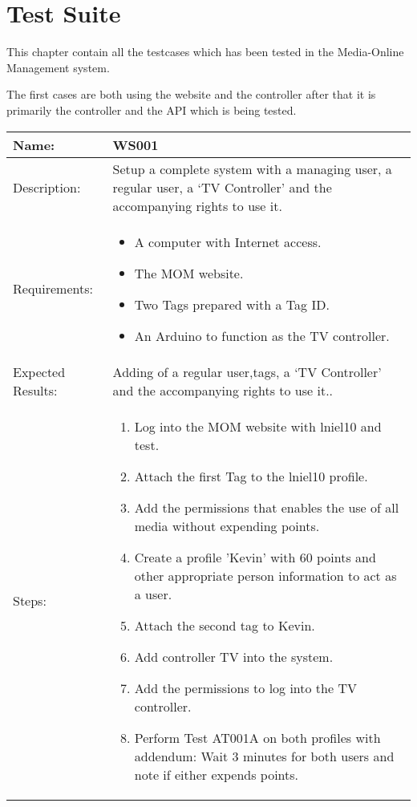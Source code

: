 \chapter{Test Suite}
\label{appen:testSuite}
This chapter contain all the testcases which has been tested in the Media-Online Management system.

The first cases are both using the website and the controller after that it is primarily the controller and the API which is being tested.
\begin{table}[h]
	\centering
		\begin{tabular*}{\textwidth}{|l|l|}
		\hline
		\hline
		Name: & WS001\\
		\hline
		Description: & \parbox{0.70\textwidth}{Setup a complete system with a managing user, a regular user, a `TV Controller' and the accompanying rights to use it.}\\
		\hline
		Requirements: & \parbox{0.70\textwidth}{
		\begin{itemize}
			\item A computer with Internet access.
			\item The MOM website.
			\item Two Tags prepared with a Tag ID.
			\item An Arduino to function as the TV controller. 
		\end{itemize}}
		\\
		\hline
		Expected Results: & \parbox{.70\textwidth}{Adding of a regular user,tags, a `TV Controller' and the accompanying rights to use it..}\\
		\hline
		Steps: & \parbox{.70\textwidth}{
		\begin{enumerate}
			\item Log into the MOM website with lniel10 and test.
			\item Attach the first Tag to the lniel10 profile.
			\item Add the permissions that enables the use of all media without expending points.
			\item Create a profile 'Kevin' with 60 points and other appropriate person information to act as a user.
			\item Attach the second tag to Kevin.
			\item Add controller TV into the system.
			\item Add the permissions to log into the TV controller.
			\item Perform Test AT001A on both profiles with addendum: Wait 3 minutes for both users and note if either expends points.

\end{enumerate}}
\end{tabular*}
\end{table}
